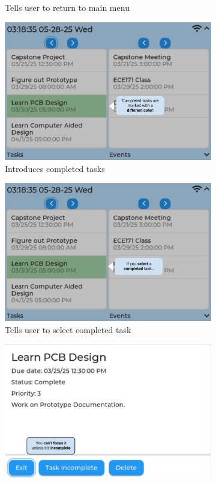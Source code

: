 \documentclass{article}
\begin{document}
\begin{figure}
\begin{subfigure}{0.5\textwidth}
        \caption{Tells user to return to main menu}
    \end{subfigure}
    \begin{subfigure}{0.5\textwidth}
        \includegraphics[width = \textwidth]{completed_task.png}
        \caption{Introduces completed tasks}
    \end{subfigure}
    \begin{subfigure}{0.5\textwidth}
        \includegraphics[width = \textwidth]{select_completed.png}
        \caption{Tells user to select completed task}
    \end{subfigure}
    \begin{subfigure}{0.5\textwidth}
        \includegraphics[width = \textwidth]{cant_focus.png}

\end{subfigure}
\end{figure}
\end{document}
